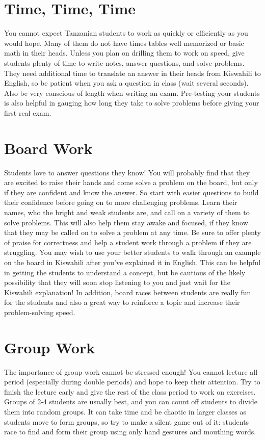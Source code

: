 \section{Time, Time, Time}
You cannot expect Tanzanian students to work as quickly or efficiently as you would hope. Many of them do not have times tables well memorized or basic math in their heads. Unless you plan on drilling them to work on speed, give students plenty of time to write notes, answer questions, and solve problems. They need additional time to translate an answer in their heads from Kiswahili to English, so be patient when you ask a question in class (wait several seconds). Also be very conscious of length when writing an exam. Pre-testing your students is also helpful in gauging how long they take to solve problems before giving your first real exam.
\section{Board Work}
Students love to answer questions they know! You will probably find that they are excited to raise their hands and come solve a problem on the board, but only if they are confident and know the answer. So start with easier questions to build their confidence before going on to more challenging problems. Learn their names, who the bright and weak students are, and call on a variety of them to solve problems. This will also help them stay awake and focused, if they know that they may be called on to solve a problem at any time. Be sure to offer plenty of praise for correctness and help a student work through a problem if they are struggling. You may wish to use your better students to walk through an example on the board in Kiswahili after you've explained it in English. This can be helpful in getting the students to understand a concept, but be cautious of the likely possibility that they will soon stop listening to you and just wait for the Kiswahili explanation! In addition, board races between students are really fun for the students and also a great way to reinforce a topic and increase their problem-solving speed.
\section{Group Work}
The importance of group work cannot be stressed enough! You cannot lecture all period (especially during double periods) and hope to keep their attention. Try to finish the lecture early and give the rest of the class period to work on exercises. Groups of 2-4 students are usually best, and you can count off students to divide them into random groups. It can take time and be chaotic in larger classes as students move to form groups, so try to make a silent game out of it: students race to find and form their group using only hand gestures and mouthing words. 

